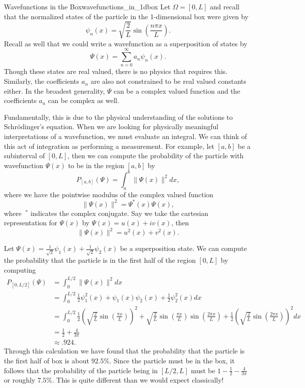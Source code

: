 \begin{ex}{Wavefunctions in the Box}{wavefunctions_in_1dbox}
	Let $\Omega=[0,L]$ and recall that the normalized states of the particle in the 1-dimensional box were given by
	\[
		\psi_n(x)=\sqrt{\frac{2}{L}} \sin\left(\frac{n \pi x}{L}\right).
	\]
	Recall as well that we could write a wavefunction as a superposition of states by
	\[
		\Psi(x)=\sum_{n=0}^\infty a_n \psi_n(x).
	\]
	Though these states are real valued, there is no physics that requires this.  Similarly, the coefficients $a_n$ are also not constrained to be real valued constants either.  In the broadest generality, $\Psi$ can be a complex valued function and the coefficients $a_n$ can be complex as well.

	Fundamentally, this is due to the physical understanding of the solutions to Schr\"odinger's equation. When we are looking for physically meaningful interpretations of a wavefunction, we must evaluate an integral. We can think of this act of integration as performing a measurement.  For example, let $[a,b]$ be a subinterval of $[0,L]$, then we can compute the probability of the particle with wavefunction $\Psi(x)$ to be in the region $[a,b]$ by 
	\[
		P_{[a,b]}(\Psi) = \int_a^b \|\Psi(x)\|^2dx,
	\]
	where we have the pointwise modulus of the complex valued function
	\[
		\|\Psi(x)\|^2 = \Psi^*(x)\Psi(x),
	\]
	where $~^*$ indicates the complex conjugate.  Say we take the cartesian representation for $\Psi(x)$ by $\Psi(x)=u(x)+iv(x)$, then
	\[
		\|\Psi(x)\|^2 = u^2(x)+v^2(x).
	\]
	
	Let $\Psi(x)=\frac{1}{\sqrt{2}}\psi_1(x)+\frac{1}{\sqrt{2}}\psi_2(x)$ be a superposition state.  We can compute the probability that the particle is in the first half of the region $[0,L]$ by computing
	\begin{align*}
		P_{[0,L/2]}(\Psi)&=\int_{0}^{L/2}  \|\Psi(x)\|^2 dx \\
			&=\int_{0}^{L/2} \frac{1}{2}\psi_1^2(x)+ \psi_1(x)\psi_2(x)+\frac{1}{2}\psi_2^2(x)dx\\
			&=\int_{0}^{L/2}\frac{1}{2} \left(\sqrt{\frac{2}{L}}\sin\left(\frac{\pi x}{L}\right)\right)^2 + \sqrt{\frac{2}{L}}\sin\left(\frac{\pi x}{L}\right)\sin\left(\frac{2\pi x}{L}\right)+ \frac{1}{2}\left(\sqrt{\frac{2}{L}}\sin\left(\frac{2\pi x}{L}\right)\right)^2dx\\
			&=\frac{1}{2}+\frac{4}{3\pi}\\
			&\approx .924.
	\end{align*}
	Through this calculation we have found that the probability that the particle is the first half of box is about $92.5\%$.  Since the particle must be in the box, it follows that the probability of the particle being in $[L/2,L]$ must be $1-\frac{1}{2}-\frac{4}{3\pi}$ or roughly $7.5\%$.  This is quite different than we would expect classically!


\end{ex}
